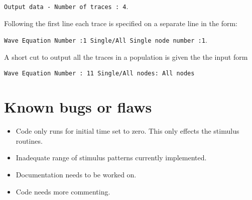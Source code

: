 \documentclass[12pt,a4paper]{article}
\begin{document}
{\tt \small Output data - Number of traces : 4}.

Following the first line
each trace is specified on a separate line in the form:

{\tt \small Wave Equation Number :1 Single/All Single node number :1}.

A short cut to output all the traces in a population is given the the
input form

{\tt \small Wave Equation Number : 11 Single/All nodes: All nodes}


\section{Known bugs or flaws} 

\begin{itemize}
    
\item Code only runs for initial time set to zero. This only effects the
stimulus routines.

\item Inadequate range of stimulus patterns currently implemented.

\item Documentation needs to be worked on.

\item Code needs more commenting.

\end{itemize}
\end{document}
